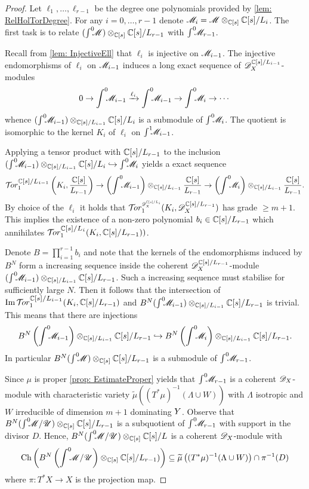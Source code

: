 \begin{proof}
  Let $\ell_1,\ldots,\ell_{r-1}$ be the degree one polynomials provided by \cref{lem: RelHolTorDegree}.
  For any $i=0,\ldots, r-1$ denote $\mathscr{M}_i =  \mathscr{M} \otimes_{\mathbb{C}[s]} \mathbb{C}[s]/L_{i}$.
  The first task is to relate $(\int^0 \mkern -8mu\mathscr{M}) \otimes_{\mathbb{C}[s]} \mathbb{C}[s]/L_{r-1}$ with $\int^0 \mkern -8mu\mathscr{M}_{r-1}$.

  Recall from \cref{lem: InjectiveEll} that $\ell_{i}$ is injective on $\mathscr{M}_{i-1}$.
  The injective endomorphisms of $\ell_i$ on $\mathscr{M}_{i-1}$ induces a long exact sequence of $\mathscr{D}_X^{\mathbb{C}[s]/L_{i-1}}$-modules
  $$0 \to \int^0 \mkern -8mu\mathscr{M}_{i-1} \xrightarrow{\ell_i} \int^0 \mkern -8mu \mathscr{M}_{i-1} \to \int^0 \mkern -8mu \mathscr{M}_i \to \cdots $$
  whence $(\int^0 \mkern -8mu \mathscr{M}_{i-1})\otimes_{\mathbb{C}[s]/L_{i-1}} \mathbb{C}[s]/L_i$ is a submodule of $\int^0 \mkern -8mu\mathscr{M}_i$.
  The quotient is isomorphic to the kernel $K_i$ of $\ell_i$ on $\int^1\mkern -8mu\mathscr{M}_{i-1}$.

  Applying a tensor product with $\mathbb{C}[s]/L_{r-1}$ to the inclusion $(\int^0 \mkern -8mu \mathscr{M}_{i-1}) \otimes_{\mathbb{C}[s]/L_{i-1}} \mathbb{C}[s]/L_i \hookrightarrow \int^0 \mkern -8mu\mathscr{M}_i$ yields a exact sequence
  $$\Tr{\C[s]/L_{i-1}}{1}\left(K_i, \frac{\C[s]}{L_{r-1}}\right) \to \left(\Int \M_{i-1}\right) \otimes_{\C[s]/L_{i-1}}\frac{\C[s]}{L_{r-1}} \to \left(\Int\M_i\right) \otimes_{\C[s]/L_{i-1}}\frac{\C[s]}{L_{r-1}}.$$
  By choice of the $\ell_i$ it holds that $\Tr{\D_\X^{\C[s]/L_i} }{1}(K_i, \D_\X^{\C[s]/L_{r-1}})$ has grade $\geq m+1$.
  This implies the existence of a non-zero polynomial $b_i\in \mathbb{C}[s]/L_{r-1}$ which annihilates $\Tr{\C[s]/L_{i}}{1}(K_i, \C[s]/\ab L_{r-1} ))$.

  Denote $B = \prod_{i=1}^{r-1}b_i$ and note that the kernels of the endomorphisms induced by $B^N$ form a increasing sequence inside the coherent $\mathscr{D}_X^{\mathbb{C}[s]/L_{r-1}}$-module $(\int^0 \mkern -8mu \mathscr{M}_{i-1})\otimes_{\mathbb{C}[s]/L_{i-1}}\mathbb{C}[s]/L_{r-1}$.
  Such a increasing sequence must stabilise for sufficiently large $N$.
  Then it follows that the intersection of $\img \Tr{\C[s]/L_{i-1}}{1}(K_i, \C[s]/L_{r-1})$ and $ B^N(\int^0 \mkern -8mu \mathscr{M}_{i-1}) \otimes_{\mathbb{C}[s]/L_{i-1}}\mathbb{C}[s]/L_{r-1}$ is trivial.
  This means that there are injections $$B^N \left(\int^0 \mkern -8mu \mathscr{M}_{i-1}\right) \otimes_{\mathbb{C}[s]/L_{i-1}}\mathbb{C}[s]/L_{r-1} \hookrightarrow B^N \left(\int^0 \mkern -8mu\mathscr{M}_i\right)\otimes_{\mathbb{C}[s]/L_{i-1}}\mathbb{C}[s]/L_{r-1}.$$
  In particular $B^N(\int^0 \mkern -8mu\mathscr{M})\otimes_{\mathbb{C}[s]}\mathbb{C}[s]/L_{r-1}$ is a submodule of $\int^0 \mkern -8mu\mathscr{M}_{r-1}$.


  Since $\mu$ is proper \cref{prop: EstimateProper} yields that $\int^0 \mkern -8mu \mathscr{M}_{r-1}$ is a coherent $\mathscr{D}_X$-module with characteristic variety $\widetilde{\mu}((T^*\mu)^{-1}(\Lambda\cup W))$ with $\Lambda$ isotropic and $W$ irreducible of dimension $m+1$ dominating $Y$.
  Observe that $B^N(\int^0 \mkern -8mu\mathscr{M}/ \mathscr{U})\otimes_{\mathbb{C}[s]}\mathbb{C}[s]/L_{r-1}$ is a subquotient of $\int^0 \mkern -8mu\mathscr{M}_{r-1}$ with support in the divisor $D$.
  Hence, $B^N(\int^0 \mkern -8mu\mathscr{M}/ \mathscr{U})\otimes_{\mathbb{C}[s]}\mathbb{C}[s]/L$ is a coherent $\mathscr{D}_X$-module with
  $$\operatorname{Ch}\left( B^N\left(\int^0 \mkern -8mu\mathscr{M}/ \mathscr{U}\right)\otimes_{\mathbb{C}[s]}\mathbb{C}[s]/L_{r-1}) \right)\subseteq  \widetilde{\mu}\left((T^*\mu)^{-1}(\Lambda\cup W)\right) \cap \pi^{-1}(D)$$
  where $\pi:T^*X\to X$ is the projection map.


\end{proof}
